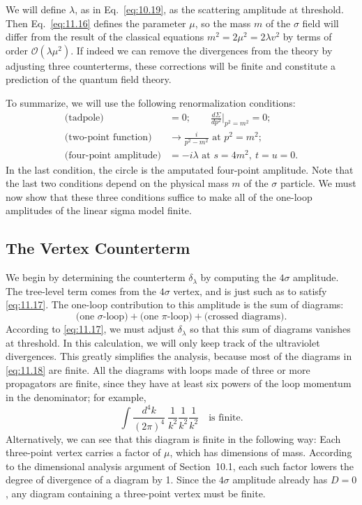 We will define $\lambda$, as in Eq.~\eqref{eq:10.19}, as the scattering
amplitude at threshold.  Then Eq.~\eqref{eq:11.16} defines the parameter
$\mu$, so the mass $m$ of the $\sigma$ field will differ from the result of the
classical equations $m^2 = 2\mu^2 = 2\lambda v^2$ by terms of order
$\mathcal{O}(\lambda\mu^2)$.  If indeed we can remove the divergences from the
theory by adjusting three counterterms, these corrections will be finite and
constitute a prediction of the quantum field theory.

To summarize, we will use the following renormalization conditions:
\begin{equation}
  \begin{aligned}
    \text{(tadpole)} &= 0;\qquad
    \frac{d\Sigma}{dp^2}\Big|_{p^2=m^2} = 0;\\
    \text{(two-point function)} &\to \frac{i}{p^2-m^2}
      \text{ at } p^2 = m^2 ;\\
    \text{(four-point amplitude)} &= -i\lambda \text{ at } s = 4m^2,\
      t = u = 0 .
  \end{aligned}
  \label{eq:11.17}
\end{equation}
In the last condition, the circle is the amputated four-point amplitude.
Note that the last two conditions depend on the physical mass $m$ of the
$\sigma$ particle.  We must now show that these three conditions suffice to
make all of the one-loop amplitudes of the linear sigma model finite.

\subsection{The Vertex Counterterm}

We begin by determining the counterterm $\delta_\lambda$ by computing the
$4\sigma$ amplitude.  The tree-level term comes from the $4\sigma$ vertex, and
is just such as to satisfy \eqref{eq:11.17}.  The one-loop contribution to
this amplitude is the sum of diagrams:
\begin{equation}
  \text{(one $\sigma$-loop)} + \text{(one $\pi$-loop)} + \text{(crossed
    diagrams)} .
  \label{eq:11.18}
\end{equation}
According to \eqref{eq:11.17}, we must adjust $\delta_\lambda$ so that this
sum of diagrams vanishes at threshold.  In this calculation, we will only keep
track of the ultraviolet divergences.  This greatly simplifies the analysis,
because most of the diagrams in \eqref{eq:11.18} are finite.  All the diagrams
with loops made of three or more propagators are finite, since they have at
least six powers of the loop momentum in the denominator; for example,
\begin{equation}
  \int \frac{d^4k}{(2\pi)^4}\ \frac{1}{k^2}\frac{1}{k^2}\frac{1}{k^2}
  \quad \text{is finite} .
\end{equation}
Alternatively, we can see that this diagram is finite in the following way:
Each three-point vertex carries a factor of $\mu$, which has dimensions of
mass.  According to the dimensional analysis argument of Section~10.1, each
such factor lowers the degree of divergence of a diagram by 1.  Since the
$4\sigma$ amplitude already has $D = 0$, any diagram containing a three-point
vertex must be finite.

